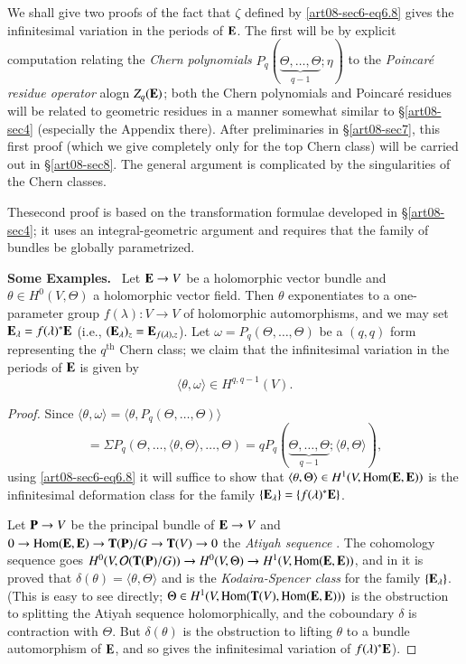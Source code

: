 We shall give two proofs of the fact that $\zeta$ defined by \eqref{art08-sec6-eq6.8} gives the infinitesimal variation in the periods of $\mathbf{E}$. The first will be by explicit computation relating the {\em Chern polynomials} $P_{q}(\underbrace{\Theta,\ldots,\Theta}_{q-1};\eta)$ to the {\em Poincar\'e residue operator} alogn $Z_{q}(\mathbf{E})$; both the Chern polynomials and Poincar\'e residues will be related to geometric residues in a manner somewhat similar to \S\ref{art08-sec4} (especially the Appendix there). After preliminaries in \S\ref{art08-sec7}, this first proof (which we give completely only for the top Chern class) will be carried out in \S\ref{art08-sec8}. The general argument is complicated by the singularities of the Chern classes.

The\pageoriginale second proof is based on the transformation formulae developed in \S\ref{art08-sec4}; it uses an integral-geometric argument and requires that the family of bundles be globally parametrized.

\medskip
\noindent
{\bf Some Examples.}~ Let $\mathbf{E}\to V$ be a holomorphic vector bundle and $\theta\in H^{0}(V,\Theta)$ a holomorphic vector field. Then $\theta$ exponentiates to a one-parameter group $f(\lambda):V\to V$ of holomorphic automorphisms, and we may set $\mathbf{E}_{\lambda}=f(\lambda)^{*}\mathbf{E}$ (i.e., $(\mathbf{E}_{\lambda})_{z}=\mathbf{E}_{f(\lambda),z}$). Let $\omega=P_{q}(\Theta,\ldots,\Theta)$ be a $(q,q)$ form representing the $q^{\text{th}}$ Chern class; we claim that the infinitesimal variation in the periods of $\mathbf{E}$ is given by
\begin{equation}
\langle \theta,\omega\rangle \in H^{q,q-1}(V).\label{art08-sec6-eq6.9}
\end{equation}

\begin{proof}
Since $\langle \theta,\omega\rangle=\langle \theta, P_{q}(\Theta,\ldots,\Theta)\rangle$
$$
=\Sigma P_{q}(\Theta,\ldots,\langle \theta,\Theta\rangle,\ldots,\Theta)=qP_{q}(\underbrace{\Theta,\ldots,\Theta}_{q-1};\langle \theta,\Theta\rangle),
$$
using \eqref{art08-sec6-eq6.8} it will suffice to show that $\langle \theta,\Theta\rangle\in H^{1}(V,\operatorname{\mathrm{Hom}}(\mathbf{E},\mathbf{E}))$ is the infinitesimal deformation class for the family $\{\mathbf{E}_{\lambda}\}=\{f(\lambda)^{*}\mathbf{E}\}$. 

Let $\mathbf{P}\to V$ be the principal bundle of $\mathbf{E}\to V$ and $0\to \operatorname{\mathrm{Hom}}(\mathbf{E},\mathbf{E})\to \mathbf{T}(\mathbf{P})/G\to \mathbf{T}(V)\to 0$ the {\em Atiyah sequence} \cite{art08-key1}. The cohomology sequence goes $H^{0}(V,\mathcal{O}(\mathbf{T}(\mathbf{P})/G))\to H^{0}(V,\Theta)\to H^{1}(V,\operatorname{\mathrm{Hom}}(\mathbf{E},\mathbf{E}))$, and in \cite{art08-key8} it is proved that $\delta(\theta)=\langle \theta,\Theta\rangle$ and is the {\em Kodaira-Spencer class} for the family $\{\mathbf{E}_{\lambda}\}$. (This is easy to see directly; $\Theta\in H^{1}(V,\operatorname{\mathrm{Hom}}(\mathbf{T}(V),\operatorname{\mathrm{Hom}}(\mathbf{E},\mathbf{E})))$ is the obstruction to splitting the Atiyah sequence holomorphically, and the coboundary $\delta$ is contraction with $\Theta$. But $\delta(\theta)$ is the obstruction to lifting $\theta$ to a bundle automorphism of $\mathbf{E}$, and so gives the infinitesimal variation of $f(\lambda)^{*}\mathbf{E}$).
\end{proof}

